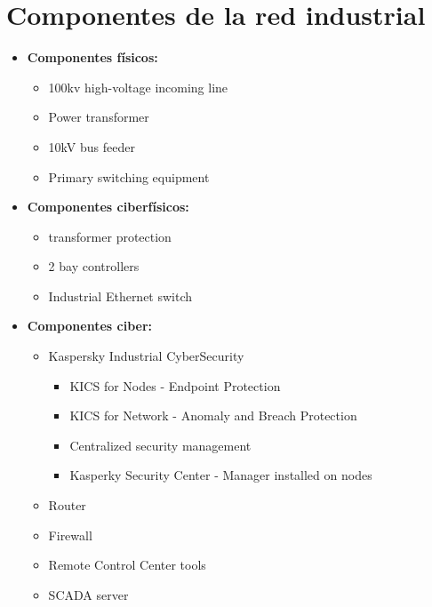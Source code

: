 \section{Componentes de la red industrial}

\begin{itemize}
   \item \textbf{Componentes físicos:}
   \begin{itemize}
      \item 100kv high-voltage incoming line
      \item Power transformer
      \item 10kV bus feeder
      \item Primary switching equipment
   \end{itemize}
   \item \textbf{Componentes ciberfísicos:}
   \begin{itemize}
      \item transformer protection
      \item 2 bay controllers
      \item Industrial Ethernet switch
   \end{itemize}
   \item \textbf{Componentes ciber:}
   \begin{itemize}
      \item Kaspersky Industrial CyberSecurity
      \begin{itemize}
         \item \textsc{KICS} for Nodes - Endpoint Protection
         \item \textsc{KICS} for Network - Anomaly and Breach Protection
         \item Centralized security management
         \item Kasperky Security Center - Manager installed on nodes
      \end{itemize}
      \item Router
      \item Firewall
      \item Remote Control Center tools
      \item SCADA server
   \end{itemize}
\end{itemize}

